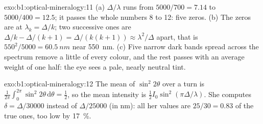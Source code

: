 \begin{solution}{exo:b1:optical-mineralogy:11}
(a) $\Delta/\lambda$ runs from $5000/700 = 7.14$ to $5000/400 = 12.5$; it
passes the whole numbers 8 to 12: five zeros. (b) The zeros are at
$\lambda_k = \Delta/k$; two successive ones are $\Delta/k - \Delta/(k + 1) =
\Delta/(k(k + 1)) \approx \lambda^2/\Delta$ apart, that is $550^2/5000 =
\qty{60.5}{nm}$ near \qty{550}{nm}. (c) Five narrow dark bands spread across
the spectrum remove a little of every colour, and the rest passes with an
average weight of one half: the eye sees a pale, nearly neutral tint.
\end{solution}

\begin{solution}{exo:b1:optical-mineralogy:12}
The mean of $\sin^2 2\theta$ over a turn is $\frac1{2\pi}\int_0^{2\pi}\sin^2 2\theta\,
\mathrm d\theta = \frac12$, so the mean intensity is
$\frac12 I_0\sin^2(\pi\Delta/\lambda)$. She computes $\delta = \Delta/30000$
instead of $\Delta/25000$ (in nm): all her values are $25/30 = 0.83$ of the
true ones, too low by \qty{17}{\percent}.
\end{solution}


